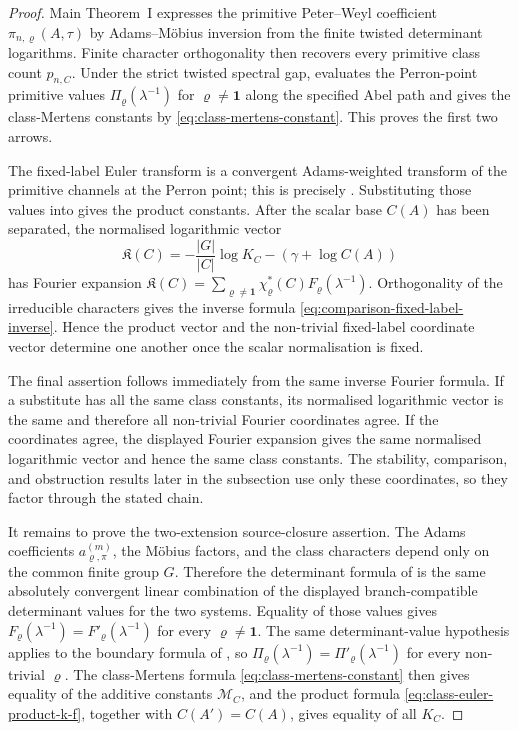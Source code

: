\documentclass[11pt,a4paper]{amsart}
\theoremstyle{plain}
\theoremstyle{definition}
\theoremstyle{remark}
\begin{document}
\begin{proof}
  Main Theorem~I expresses the primitive Peter--Weyl coefficient
  \(\pi_{n,\varrho}(A,\tau)\) by Adams--M\"obius inversion from the finite
  twisted determinant logarithms.  Finite character orthogonality then
  recovers every primitive class count \(p_{n,C}\).  Under the strict twisted
  spectral gap,  evaluates the Perron-point
  primitive values \(\Pi_\varrho(\lambda^{-1})\) for
  \(\varrho\ne\mathbf1\) along the specified Abel path and gives the
  class-Mertens constants by \eqref{eq:class-mertens-constant}.  This proves
  the first two arrows.

  The fixed-label Euler transform is a convergent Adams-weighted transform of
  the primitive channels at the Perron point; this is precisely
  .  Substituting those values into
   gives the product constants.  After
  the scalar base \(C(A)\) has been separated, the normalised logarithmic
  vector
  \[
    \mathfrak K(C)=-\frac{|G|}{|C|}\log K_C-(\gamma+\log C(A))
  \]
  has Fourier expansion
  \(\mathfrak K(C)=\sum_{\varrho\ne\mathbf1}
  \chi_\varrho^\ast(C)F_\varrho(\lambda^{-1})\).  Orthogonality of the
  irreducible characters gives the inverse formula
  \eqref{eq:comparison-fixed-label-inverse}.  Hence the product vector and
  the non-trivial fixed-label coordinate vector determine one another once
  the scalar normalisation is fixed.

  The final assertion follows immediately from the same inverse Fourier
  formula.  If a substitute has all the same class constants, its normalised
  logarithmic vector is the same and therefore all non-trivial Fourier
  coordinates agree.  If the coordinates agree, the displayed Fourier
  expansion gives the same normalised logarithmic vector and hence the same
  class constants.  The stability, comparison, and obstruction results later
  in the subsection use only these coordinates, so they factor through the
  stated chain.

  It remains to prove the two-extension source-closure assertion.  The Adams
  coefficients \(a_{\varrho,\pi}^{(m)}\), the M\"obius factors, and the class
  characters depend only on the common finite group \(G\).  Therefore the
  determinant formula of  is the
  same absolutely convergent linear combination of the displayed
  branch-compatible determinant values for the two systems.  Equality of
  those values gives
  \(F_\varrho(\lambda^{-1})=F'_{\varrho}(\lambda^{-1})\) for every
  \(\varrho\ne\mathbf1\).  The same determinant-value hypothesis applies to
  the boundary formula of ,
  so
  \(\Pi_\varrho(\lambda^{-1})=\Pi'_{\varrho}(\lambda^{-1})\) for every
  non-trivial \(\varrho\).  The class-Mertens formula
  \eqref{eq:class-mertens-constant} then gives equality of the additive
  constants \(\mathcal M_C\), and the product formula
  \eqref{eq:class-euler-product-k-f}, together with
  \(C(A')=C(A)\), gives equality of all \(K_C\).


\end{proof}
\end{document}
